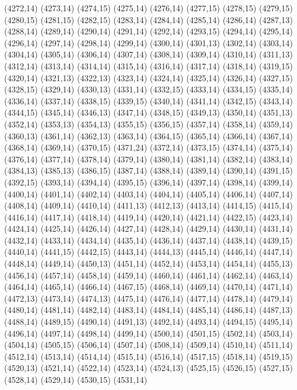 (4272,14)
(4273,14)
(4274,15)
(4275,14)
(4276,14)
(4277,15)
(4278,15)
(4279,15)
(4280,15)
(4281,15)
(4282,15)
(4283,14)
(4284,14)
(4285,14)
(4286,14)
(4287,13)
(4288,14)
(4289,14)
(4290,14)
(4291,14)
(4292,14)
(4293,15)
(4294,14)
(4295,14)
(4296,14)
(4297,14)
(4298,14)
(4299,14)
(4300,14)
(4301,13)
(4302,14)
(4303,14)
(4304,14)
(4305,14)
(4306,14)
(4307,14)
(4308,14)
(4309,14)
(4310,14)
(4311,13)
(4312,14)
(4313,14)
(4314,14)
(4315,14)
(4316,14)
(4317,14)
(4318,14)
(4319,15)
(4320,14)
(4321,13)
(4322,13)
(4323,14)
(4324,14)
(4325,14)
(4326,14)
(4327,15)
(4328,15)
(4329,14)
(4330,13)
(4331,14)
(4332,15)
(4333,14)
(4334,15)
(4335,14)
(4336,14)
(4337,14)
(4338,15)
(4339,15)
(4340,14)
(4341,14)
(4342,15)
(4343,14)
(4344,15)
(4345,14)
(4346,13)
(4347,14)
(4348,15)
(4349,13)
(4350,14)
(4351,13)
(4352,14)
(4353,13)
(4354,13)
(4355,15)
(4356,15)
(4357,14)
(4358,14)
(4359,14)
(4360,13)
(4361,14)
(4362,13)
(4363,14)
(4364,15)
(4365,14)
(4366,14)
(4367,14)
(4368,14)
(4369,14)
(4370,15)
(4371,24)
(4372,14)
(4373,15)
(4374,14)
(4375,14)
(4376,14)
(4377,14)
(4378,14)
(4379,14)
(4380,14)
(4381,14)
(4382,14)
(4383,14)
(4384,13)
(4385,13)
(4386,15)
(4387,14)
(4388,14)
(4389,14)
(4390,14)
(4391,15)
(4392,15)
(4393,14)
(4394,14)
(4395,15)
(4396,14)
(4397,14)
(4398,14)
(4399,14)
(4400,14)
(4401,14)
(4402,14)
(4403,14)
(4404,14)
(4405,14)
(4406,14)
(4407,14)
(4408,14)
(4409,14)
(4410,14)
(4411,13)
(4412,13)
(4413,14)
(4414,15)
(4415,14)
(4416,14)
(4417,14)
(4418,14)
(4419,14)
(4420,14)
(4421,14)
(4422,15)
(4423,14)
(4424,14)
(4425,14)
(4426,14)
(4427,14)
(4428,14)
(4429,14)
(4430,14)
(4431,14)
(4432,14)
(4433,14)
(4434,14)
(4435,14)
(4436,14)
(4437,14)
(4438,14)
(4439,15)
(4440,14)
(4441,15)
(4442,15)
(4443,14)
(4444,13)
(4445,14)
(4446,14)
(4447,14)
(4448,14)
(4449,14)
(4450,13)
(4451,14)
(4452,14)
(4453,14)
(4454,14)
(4455,13)
(4456,14)
(4457,14)
(4458,14)
(4459,14)
(4460,14)
(4461,14)
(4462,14)
(4463,14)
(4464,14)
(4465,14)
(4466,14)
(4467,15)
(4468,14)
(4469,14)
(4470,14)
(4471,14)
(4472,13)
(4473,14)
(4474,13)
(4475,14)
(4476,14)
(4477,14)
(4478,14)
(4479,14)
(4480,14)
(4481,14)
(4482,14)
(4483,14)
(4484,14)
(4485,14)
(4486,14)
(4487,13)
(4488,14)
(4489,15)
(4490,14)
(4491,13)
(4492,14)
(4493,14)
(4494,15)
(4495,14)
(4496,14)
(4497,14)
(4498,14)
(4499,14)
(4500,14)
(4501,15)
(4502,14)
(4503,14)
(4504,14)
(4505,15)
(4506,14)
(4507,14)
(4508,14)
(4509,14)
(4510,14)
(4511,14)
(4512,14)
(4513,14)
(4514,14)
(4515,14)
(4516,14)
(4517,15)
(4518,14)
(4519,15)
(4520,13)
(4521,14)
(4522,14)
(4523,14)
(4524,13)
(4525,15)
(4526,15)
(4527,15)
(4528,14)
(4529,14)
(4530,15)
(4531,14)
